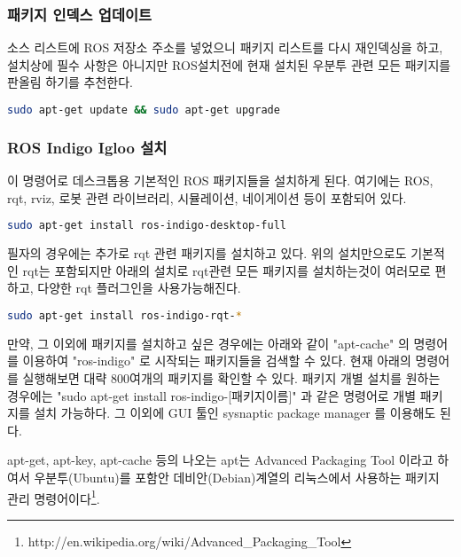 \subsubsection{패키지 인덱스 업데이트}
소스 리스트에 ROS 저장소 주소를 넣었으니 패키지 리스트를 다시 재인덱싱을 하고, 설치상에 필수 사항은 아니지만 ROS설치전에 현재 설치된 우분투 관련 모든 패키지를 판올림 하기를 추천한다.

\begin{lstlisting}[language=bash]
sudo apt-get update && sudo apt-get upgrade
\end{lstlisting}

\subsubsection{ROS Indigo Igloo 설치}
이 명령어로 데스크톱용 기본적인 ROS 패키지들을 설치하게 된다. 여기에는 ROS, rqt, rviz, 로봇 관련 라이브러리, 시뮬레이션, 네이게이션 등이 포함되어 있다.

\begin{lstlisting}[language=bash]
sudo apt-get install ros-indigo-desktop-full
\end{lstlisting}

필자의 경우에는 추가로 rqt 관련 패키지를 설치하고 있다. 위의 설치만으로도 기본적인 rqt는 포함되지만 아래의 설치로 rqt관련 모든 패키지를 설치하는것이 여러모로 편하고, 다양한 rqt 플러그인을 사용가능해진다.

\begin{lstlisting}[language=bash]
sudo apt-get install ros-indigo-rqt-*
\end{lstlisting}

만약, 그 이외에 패키지를 설치하고 싶은 경우에는 아래와 같이  "apt-cache" 의 명령어를 이용하여 "ros-indigo" 로 시작되는 패키지들을 검색할 수 있다. 현재 아래의 명령어를 실행해보면 대략 800여개의 패키지를 확인할 수 있다. 패키지 개별 설치를 원하는 경우에는 "sudo apt-get install ros-indigo-[패키지이름]" 과 같은 명령어로 개별 패키지를 설치 가능하다. 그 이외에 GUI 툴인 sysnaptic package manager 를 이용해도 된다.

\begin{exercise}
apt-get, apt-key, apt-cache 등의 나오는 apt는 Advanced Packaging Tool 이라고 하여서 우분투(Ubuntu)를 포함안 데비안(Debian)계열의 리눅스에서 사용하는 패키지 관리 명령어이다\footnote{http://en.wikipedia.org/wiki/Advanced\_Packaging\_Tool}.
\end{exercise}

